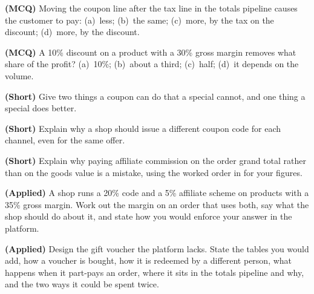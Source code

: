 \begin{reviewq}
  \item \textbf{(MCQ)} Moving the coupon line after the tax line in the totals
        pipeline causes the customer to pay: (a)~less; (b)~the same;
        (c)~more, by the tax on the discount; (d)~more, by the discount.
  \item \textbf{(MCQ)} A 10\% discount on a product with a 30\% gross margin
        removes what share of the profit? (a)~10\%; (b)~about a third;
        (c)~half; (d)~it depends on the volume.
  \item \textbf{(Short)} Give two things a coupon can do that a special cannot,
        and one thing a special does better.
  \item \textbf{(Short)} Explain why a shop should issue a different coupon
        code for each channel, even for the same offer.
  \item \textbf{(Short)} Explain why paying affiliate commission on the order
        grand total rather than on the goods value is a mistake, using the
        worked order in  for your figures.
  \item \textbf{(Applied)} A shop runs a 20\% code and a 5\% affiliate scheme
        on products with a 35\% gross margin. Work out the margin on an order
        that uses both, say what the shop should do about it, and state how you
        would enforce your answer in the platform.
  \item \textbf{(Applied)} Design the gift voucher the platform lacks. State
        the tables you would add, how a voucher is bought, how it is redeemed
        by a different person, what happens when it part-pays an order, where
        it sits in the totals pipeline and why, and the two ways it could be
        spent twice.
\end{reviewq}
